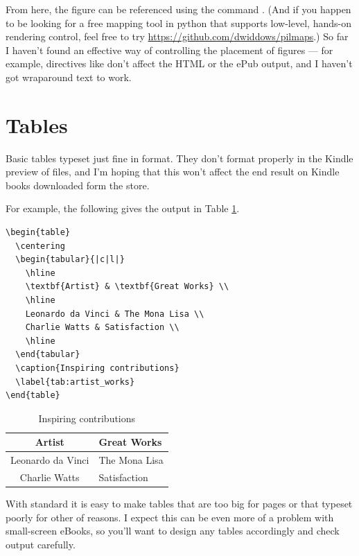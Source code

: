 From here, the figure can be referenced using the command 
. (And if you happen to be looking for a free mapping tool in python that
supports low-level, hands-on rendering control, feel free to try {\small \url{https://github.com/dwiddows/pilmaps}}.) 
So far I haven't found an effective way of controlling the placement of figures --- for example, directives
like  don't affect the HTML or the ePub output, and I haven't got
wraparound text to work.

\section{Tables}

Basic tables typeset just fine in  format. They don't format properly in the Kindle preview of  files,
and I'm hoping that this won't affect the end result on Kindle   books downloaded form the store.

For example, the following \latex gives the output in Table \ref{tab:artist_works}.

\begin{Verbatim}[fontsize=\footnotesize]
\begin{table}
  \centering
  \begin{tabular}{|c|l|}
    \hline
    \textbf{Artist} & \textbf{Great Works} \\
    \hline
    Leonardo da Vinci & The Mona Lisa \\
    Charlie Watts & Satisfaction \\
    \hline
  \end{tabular}
  \caption{Inspiring contributions}
  \label{tab:artist_works}
\end{table}
\end{Verbatim}

\begin{table}
 \centering
  \begin{tabular}{|c|l|}
    \hline
    \textbf{Artist} & \textbf{Great Works} \\
    \hline
    Leonardo da Vinci & The Mona Lisa \\
    Charlie Watts & Satisfaction \\
    \hline
  \end{tabular}
  \caption{Inspiring contributions}
  \label{tab:artist_works}
\end{table}

With standard \latex it is easy to make tables that are too big for pages or that typeset poorly for other of reasons.
I expect this can be even more of a problem with small-screen eBooks, so you'll want to design any tables accordingly
and check output carefully.

